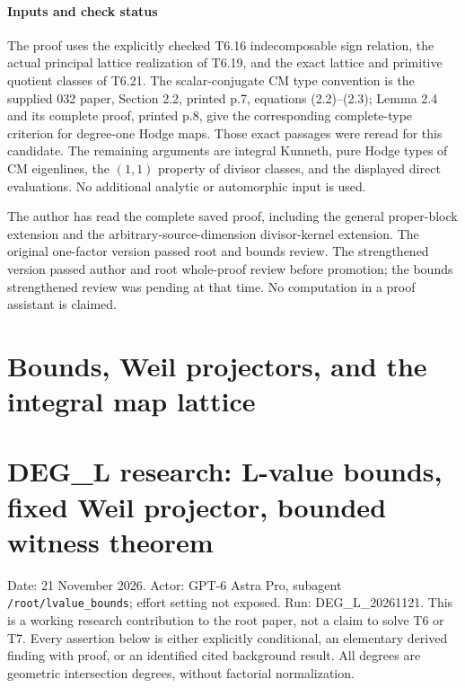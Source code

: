\documentclass[11pt,a4paper]{article}
\providecommand{\tightlist}{\setlength{\itemsep}{0pt}\setlength{\parskip}{0pt}}
\theoremstyle{definition}
\begin{document}
\paragraph{Inputs and check status}\label{inputs-and-check-status}

The proof uses the explicitly checked T6.16 indecomposable sign relation, the actual principal lattice realization of T6.19, and the exact lattice and primitive quotient classes of T6.21. The scalar-conjugate CM type convention is the supplied 032 paper, Section 2.2, printed p.7, equations (2.2)--(2.3); Lemma 2.4 and its complete proof, printed p.8, give the corresponding complete-type criterion for degree-one Hodge maps. Those exact passages were reread for this candidate. The remaining arguments are integral Kunneth, pure Hodge types of CM eigenlines, the \((1,1)\) property of divisor classes, and the displayed direct evaluations. No additional analytic or automorphic input is used.

The author has read the complete saved proof, including the general proper-block extension and the arbitrary-source-dimension divisor-kernel extension. The original one-factor version passed root and bounds review. The strengthened version passed author and root whole-proof review before promotion; the bounds strengthened review was pending at that time. No computation in a proof assistant is claimed.

\section{Bounds, Weil projectors, and the integral map lattice}

\providecommand{\tightlist}{\setlength{\itemsep}{0pt}\setlength{\parskip}{0pt}}
\section{DEG\_L research: L-value bounds, fixed Weil projector, bounded witness theorem}\label{deg_l-research-l-value-bounds-fixed-weil-projector-bounded-witness-theorem}

Date: 21 November 2026. Actor: GPT-6 Astra Pro, subagent \texttt{/root/lvalue\_bounds}; effort setting not exposed. Run: DEG\_L\_20261121. This is a working research contribution to the root paper, not a claim to solve T6 or T7. Every assertion below is either explicitly conditional, an elementary derived finding with proof, or an identified cited background result. All degrees are geometric intersection degrees, without factorial normalization.
\end{document}
